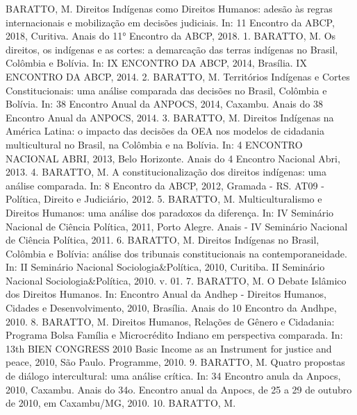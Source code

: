 \begin{cvhonors}
  \cvhonor
    {BARATTO, M.}
    {Direitos Indígenas como Direitos Humanos: adesão às regras internacionais e mobilização em decisões judiciais. In: 11 Encontro da ABCP, 2018, Curitiva. Anais do 11° Encontro da ABCP, 2018.}
    {}
    {1. }
  \cvhonor
    {BARATTO, M.}
    {Os direitos, os indígenas e as cortes: a demarcação das terras indígenas no Brasil, Colômbia e Bolívia. In: IX ENCONTRO DA ABCP, 2014, Brasília. IX ENCONTRO DA ABCP, 2014.}
    {}
    {2. }
  \cvhonor
    {BARATTO, M.}
    {Territórios Indígenas e Cortes Constitucionais: uma análise comparada das decisões no Brasil, Colômbia e Bolívia. In: 38 Encontro Anual da ANPOCS, 2014, Caxambu. Anais do 38 Encontro Anual da ANPOCS, 2014.}
    {}
    {3. }
  \cvhonor
    {BARATTO, M.}
    {Direitos Indígenas na América Latina: o impacto das decisões da OEA nos modelos de cidadania multicultural no Brasil, na Colômbia e na Bolívia. In: 4 ENCONTRO NACIONAL ABRI, 2013, Belo Horizonte. Anais do 4 Encontro Nacional Abri, 2013.}
    {}
    {4. }
  \cvhonor
    {BARATTO, M.}
    {A constitucionalização dos direitos indígenas: uma análise comparada. In: 8 Encontro da ABCP, 2012, Gramada - RS. AT09 - Política, Direito e Judiciário, 2012.}
    {}
    {5. }
  \cvhonor
    {BARATTO, M.}
    {Multiculturalismo e Direitos Humanos: uma análise dos paradoxos da diferença. In: IV Seminário Nacional de Ciência Política, 2011, Porto Alegre. Anais - IV Seminário Nacional de Ciência Política, 2011.}
    {}
    {6. }
  \cvhonor
    {BARATTO, M.}
    {Direitos Indígenas no Brasil, Colômbia e Bolívia: análise dos tribunais constitucionais na contemporaneidade. In: II Seminário Nacional Sociologia\&Política, 2010, Curitiba. II Seminário Nacional Sociologia\&Política, 2010. v. 01.}
    {}
    {7. }
  \cvhonor
    {BARATTO, M.}
    {O Debate Islâmico dos Direitos Humanos. In: Encontro Anual da Andhep - Direitos Humanos, Cidades e Desenvolvimento, 2010, Brasília. Anais do 10 Encontro da Andhpe, 2010.}
    {}
    {8. }
  \cvhonor
    {BARATTO, M.}
    {Direitos Humanos, Relações de Gênero e Cidadania: Programa Bolsa Família e Microcrédito Indiano em perspectiva comparada. In: 13th BIEN CONGRESS 2010 Basic Income as an Instrument for justice and peace, 2010, São Paulo. Programme, 2010.}
    {}
    {9. }
  \cvhonor
    {BARATTO, M.}
    {Quatro propostas de diálogo intercultural: uma análise crítica. In: 34 Encontro anula da Anpocs, 2010, Caxambu. Anais do 34o. Encontro anual da Anpocs, de 25 a 29 de outubro de 2010, em Caxambu/MG, 2010.}
    {}
    {10. }
  \cvhonor
    {BARATTO, M.}

\end{cvhonors}
